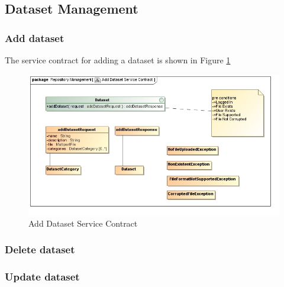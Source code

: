 \subsection{Dataset Management}

\subsubsection {Add dataset}
The service contract for adding a dataset is shown in Figure \ref{fig:addDatasetService}
\begin{figure}[H]
  \begin{center}
  \includegraphics[scale=0.6]{../Diagrams and Charts/Test Data/Add Dataset Service Contract.jpg}
  \caption{Add Dataset Service Contract}
  \label{fig:addDatasetService}
  \end{center}  
\end{figure}

\subsubsection {Delete dataset}
\subsubsection {Update dataset}
